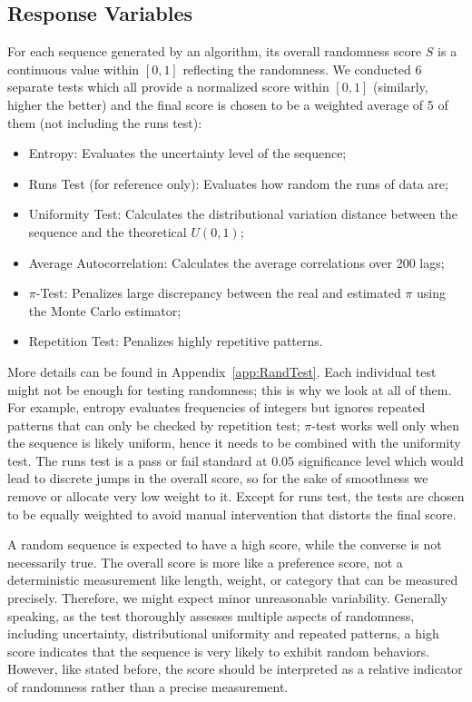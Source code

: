 \documentclass{report}
\begin{document}
\subsection{Response Variables}
For each sequence generated by an algorithm, its overall randomness score $S$ is a continuous value within $[0,1]$ reflecting the randomness. We conducted 6 separate tests which all provide a normalized score within $[0,1]$ (similarly, higher the better) and the final score is chosen to be a weighted average of 5 of them (not including the runs test):
\begin{itemize}
    \item Entropy: Evaluates the uncertainty level of the sequence;
    \item Runs Test (for reference only): Evaluates how random the runs of data are;
    \item Uniformity Test: Calculates the distributional variation distance between the sequence and the theoretical $U(0,1)$;
    \item Average Autocorrelation: Calculates the average correlations over 200 lags;
    \item $\pi$-Test: Penalizes large discrepancy between the real and estimated $\pi$ using the Monte Carlo estimator;
    \item Repetition Test: Penalizes highly repetitive patterns.
\end{itemize}
More details can be found in Appendix~\eqref{app:RandTest}. Each individual test might not be enough for testing randomness; this is why we look at all of them. For example, entropy evaluates frequencies of integers but ignores repeated patterns that can only be checked by repetition test; $\pi$-test works well only when the sequence is likely uniform, hence it needs to be combined with the uniformity test. The runs test is a pass or fail standard at 0.05 significance level which would lead to discrete jumps in the overall score, so for the sake of smoothness we remove or allocate very low weight to it. Except for runs test, the tests are chosen to be equally weighted to avoid manual intervention that distorts the final score.

A random sequence is expected to have a high score, while the converse is not necessarily true. The overall score is more like a preference score, not a deterministic measurement like length, weight, or category that can be measured precisely. Therefore, we might expect minor unreasonable variability. Generally speaking, as the test thoroughly assesses multiple aspects of randomness, including uncertainty, distributional uniformity and repeated patterns, a high score indicates that the sequence is very likely to exhibit random behaviors. However, like stated before, the score should be interpreted as a relative indicator of randomness rather than a precise measurement.
\end{document}
